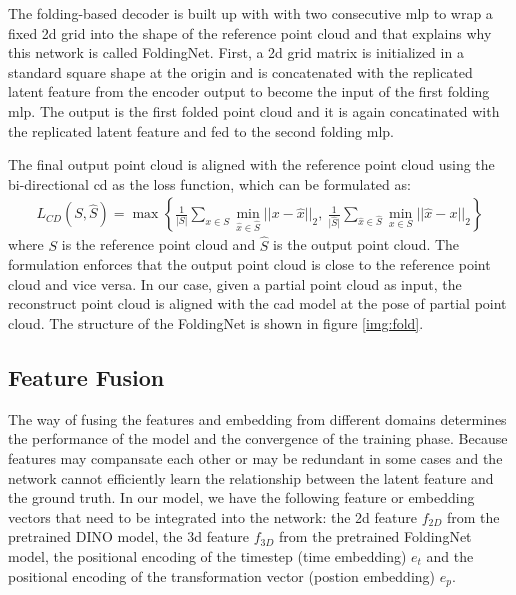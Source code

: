 \documentclass[12pt,DIV14,BCOR12mm,a4paper,footinclude=false,headinclude,parskip=half-,twoside,openright,cleardoublepage=empty,toc=index,bibliography=totoc,listof=totoc]{scrreprt}
\numberwithin{equation}{chapter}
\begin{document}
The folding-based decoder is built up with with two consecutive \gls{mlp} to wrap a fixed \gls{2d} grid into the shape of the reference point cloud and that explains why this network is called FoldingNet. First, a \gls{2d} grid matrix is initialized in a standard square shape at the origin and is concatenated with the replicated latent feature from the encoder output to become the input of the first folding \gls{mlp}. The output is the first folded point cloud and it is again concatinated with the replicated latent feature and fed to the second folding \gls{mlp}.

The final output point cloud is aligned with the reference point cloud using the bi-directional \gls{cd} as the loss function, which can be formulated as:
\begin{align}\label{eq:cd}
  L_{CD}(S, \hat{S}) = \max \left\{\frac{1}{\lvert S\rvert }\mathop{\sum}_{x\in S} \mathop{\min}_{\hat{x}\in \hat{S}}||x-\hat{x}||_{2} ,\ \frac{1}{\lvert \hat{S}\rvert }\mathop{\sum}_{\hat{x}\in \hat{S}} \mathop{\min}_{x\in S}||\hat{x}-x||_{2}\right\}
\end{align}
where $S$ is the reference point cloud and $\hat{S}$ is the output point cloud. The formulation enforces that the output point cloud is close to the reference point cloud and vice versa. In our case, given a partial point cloud as input, the reconstruct point cloud is aligned with the \gls{cad} model at the pose of partial point cloud. The structure of the FoldingNet is shown in figure \ref{img:fold}.

\subsection{Feature Fusion}\label{sec:fusion}
The way of fusing the features and embedding from different domains determines the performance of the model and the convergence of the training phase. Because features may compansate each other or may be redundant in some cases and the network cannot efficiently learn the relationship between the latent feature and the ground truth. In our model, we have the following feature or embedding vectors that need to be integrated into the network: the \gls{2d} feature $f_{2D}$ from the pretrained DINO model, the \gls{3d} feature $f_{3D}$ from the pretrained FoldingNet model, the positional encoding of the timestep (time embedding) $e_{t}$ and the positional encoding of the transformation vector (postion embedding) $e_{p}$.
\end{document}
